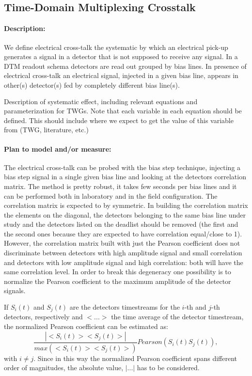 \subsection{Time-Domain Multiplexing Crosstalk}

\paragraph{Description:}
We define electrical cross-talk the systematic by which an electrical pick-up generates a signal in a detector that is not supposed to receive any signal.
In a DTM readout schema detectors are read out grouped by bias lines. In presence of electrical cross-talk an electrical signal, injected in a given bias line, appears in other(s) detector(s) fed by completely different bias line(s). 




Description of systematic effect, including relevant equations and
parameterization for TWGs. Note that each variable in each equation should be
defined. This should include where we expect to get the value of this variable
from (TWG, literature, etc.)

\paragraph{Plan to model and/or measure:}
The electrical cross-talk can be probed with the bias step technique, injecting a bias step signal in a single given bias line and looking at the detectors correlation matrix. The method is pretty robust, it takes few seconds per bias lines and it can be performed both in laboratory and in the field configuration. The correlation matrix is expected to by symmetric. In building the correlation matrix the elements on the diagonal, the detectors belonging to the same bias line under study and the detectors listed on the deadlist should be removed (the first and the second ones because they are expected to have correlation equal/close to 1).
However, the correlation matrix built with just the Pearson coefficient does not discriminate between detectors with high amplitude signal and small correlation and detectors with low amplitude signal and high correlation: both will have the same correlation level.
In order to break this degeneracy one possibility is to normalize the Pearson coefficient to the maximum amplitude of the detector signals. 

If $S_{i}(t)$ and $S_{j}(t)$ are the detectors timestreams for the $i$-th and $j$-th detectors, respectively and $< ...>$ the time average of the detector timestream, the normalized Pearson coefficient can be estimated as:
\begin{equation}\label{Pearson}
  \frac{|<S_{i}(t)> <S_{j}(t)>|}{max(<S_{i}(t)> <S_{j}(t)>)} Pearson(S_{i}(t) S_{j}(t)),
\end{equation}
with $i \neq j$.
Since in this way the normalized Pearson coefficient spans different order of magnitudes, the absolute value, $|...|$ has to be considered. 

